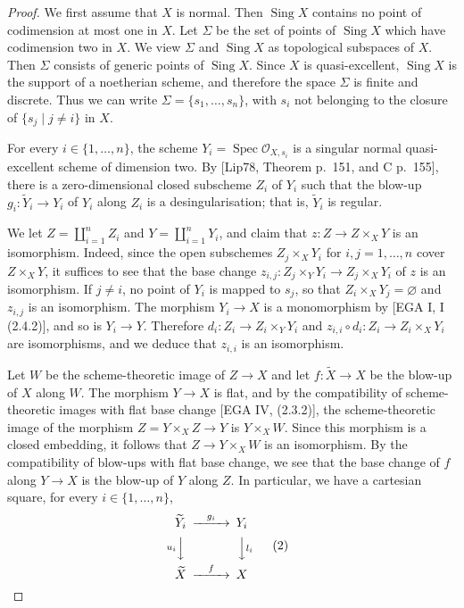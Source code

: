 \documentclass[11pt]{article}
\newcommand{\OO}{\mathcal O}
\newcommand{\Sing}{\operatorname{Sing}}
\newcommand{\Spec}{\operatorname{Spec}}
\begin{document}
\begin{proof}
We first assume that $X$ is normal. Then $\Sing X$ contains no point of codimension at most one in $X$. Let $\Sigma$ be the set of points of $\Sing X$ which have codimension two in $X$. We view $\Sigma$ and $\Sing X$ as topological subspaces of $X$. Then $\Sigma$ consists of generic points of $\Sing X$. Since $X$ is quasi-excellent, $\Sing X$ is the support of a noetherian scheme, and therefore the space $\Sigma$ is finite and discrete. Thus we can write $\Sigma=\{s_1,\ldots,s_n\}$, with $s_i$ not belonging to the closure of $\{s_j\mid j\ne i\}$ in $X$.

For every $i\in\{1,\ldots,n\}$, the scheme $Y_i=\Spec\OO_{X,s_i}$ is a singular normal quasi-excellent scheme of dimension two. By [Lip78, Theorem p.~151, and C p.~155], there is a zero-dimensional closed subscheme $Z_i$ of $Y_i$ such that the blow-up $g_i:\widetilde Y_i\to Y_i$ of $Y_i$ along $Z_i$ is a desingularisation; that is, $\widetilde Y_i$ is regular.

We let $Z=\coprod_{i=1}^nZ_i$ and $Y=\coprod_{i=1}^nY_i$, and claim that $z:Z\to Z\times_XY$ is an isomorphism. Indeed, since the open subschemes $Z_j\times_XY_i$ for $i,j=1,\ldots,n$ cover $Z\times_XY$, it suffices to see that the base change $z_{i,j}:Z_j\times_YY_i\to Z_j\times_XY_i$ of $z$ is an isomorphism. If $j\ne i$, no point of $Y_i$ is mapped to $s_j$, so that $Z_i\times_XY_j=\varnothing$ and $z_{i,j}$ is an isomorphism. The morphism $Y_i\to X$ is a monomorphism by [EGA I, I (2.4.2)], and so is $Y_i\to Y$. Therefore $d_i:Z_i\to Z_i\times_YY_i$ and $z_{i,i}\circ d_i:Z_i\to Z_i\times_XY_i$ are isomorphisms, and we deduce that $z_{i,i}$ is an isomorphism.

Let $W$ be the scheme-theoretic image of $Z\to X$ and let $f:\widetilde X\to X$ be the blow-up of $X$ along $W$. The morphism $Y\to X$ is flat, and by the compatibility of scheme-theoretic images with flat base change [EGA IV, (2.3.2)], the scheme-theoretic image of the morphism $Z=Y\times_XZ\to Y$ is $Y\times_XW$. Since this morphism is a closed embedding, it follows that $Z\to Y\times_XW$ is an isomorphism. By the compatibility of blow-ups with flat base change, we see that the base change of $f$ along $Y\to X$ is the blow-up of $Y$ along $Z$. In particular, we have a cartesian square, for every $i\in\{1,\ldots,n\}$,
\begin{equation}
\begin{CD}
\widetilde Y_i @>{g_i}>> Y_i\\
@V{u_i}VV @VV{l_i}V\\
\widetilde X @>{f}>> X
\end{CD}\tag{2}
\end{equation}


\end{proof}
\end{document}
